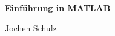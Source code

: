 \usepackage[psamsfonts]{amssymb}
\usepackage{amsmath}
\usepackage[svgnames]{xcolor} %







\begin{center}
\textbf{\LARGE Einf\"uhrung in MATLAB}\\
\end{center}
\begin{minipage}{6cm}
Jochen Schulz
\end{minipage}\hfill